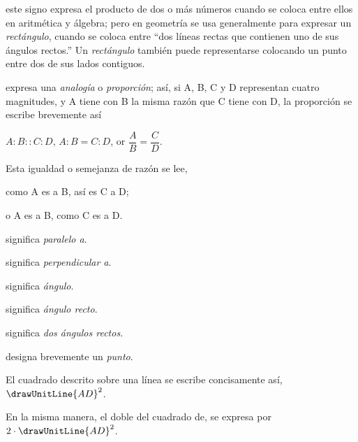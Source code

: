 \documentclass[booklanguage=english]{byrnebook}
\begin{document}
\symb{$\times$}
 este signo expresa el producto de dos o más números cuando se coloca entre ellos en aritmética y álgebra; pero en geometría se usa generalmente para expresar un \emph{rectángulo}, cuando se coloca entre \enquote{dos líneas rectas que contienen uno de sus ángulos rectos.} Un \emph{rectángulo} también puede representarse colocando un punto entre dos de sus lados contiguos.

\symb{$:\ ::\ :$}
 expresa una \emph{analogía} o \emph{proporción}; así, si A, B, C y D representan cuatro magnitudes, y A tiene con B la misma razón que C tiene con D, la proporción se escribe brevemente así

$A : B :: C : D$, $A : B = C : D$, or $\dfrac{A}{B} = \dfrac{C}{D}$.

Esta igualdad o semejanza de razón se lee,

como A es a B, así es C a D;

o A es a B, como C es a D.

\symb{$\parallel$}
 significa \emph{paralelo a}.

\symb{$\perp$}
 significa \emph{perpendicular a}.


 significa \emph{ángulo}.

 significa \emph{ángulo recto}.

\symb{\drawTwoRightAngles}
 significa \emph{dos ángulos rectos}.


designa brevemente un \emph{punto}.

El cuadrado descrito sobre una línea se escribe concisamente así, $\drawUnitLine{AD}^2$.

En la misma manera, el doble del cuadrado de, se expresa por $2 \cdot \drawUnitLine{AD}^2$.
\end{document}
